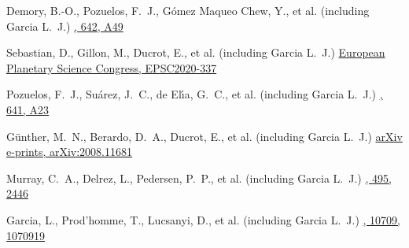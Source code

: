 {Demory, B.-O., Pozuelos, F.~J., G{\'o}mez Maqueo Chew, Y., et al. (including Garcia L.~J.)}
{\href{https://ui.adsabs.harvard.edu/abs/2020A\&A...642A..49D}{\aap, 642, A49}}

{Sebastian, D., Gillon, M., Ducrot, E., et al. (including Garcia L.~J.)}
{\href{https://ui.adsabs.harvard.edu/abs/2020EPSC...14..337S}{European Planetary Science Congress, EPSC2020-337}}

{Pozuelos, F.~J., Su{\'a}rez, J.~C., de El{\'\i}a, G.~C., et al. (including Garcia L.~J.)}
{\href{https://ui.adsabs.harvard.edu/abs/2020A\&A...641A..23P}{\aap, 641, A23}}

{G{\"u}nther, M.~N., Berardo, D.~A., Ducrot, E., et al. (including Garcia L.~J.)}
{\href{https://ui.adsabs.harvard.edu/abs/2020arXiv200811681G}{arXiv e-prints, arXiv:2008.11681}}

{Murray, C.~A., Delrez, L., Pedersen, P.~P., et al. (including Garcia L.~J.)}
{\href{https://ui.adsabs.harvard.edu/abs/2020MNRAS.495.2446M}{\mnras, 495, 2446}}

{Garcia, L., Prod'homme, T., Lucsanyi, D., et al. (including Garcia L.~J.)}
{\href{https://ui.adsabs.harvard.edu/abs/2018SPIE10709E..19G}{\procspie, 10709, 1070919}}

